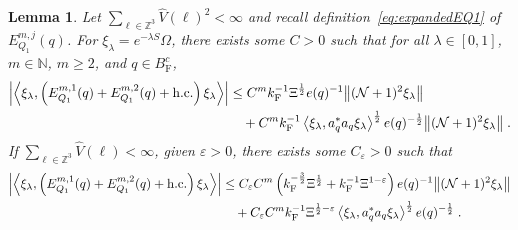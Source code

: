 \documentclass[12pt,a4paper]{article}
\numberwithin{equation}{section}
\newcommand{\NNN}{\mathbb{N}}
\newcommand{\1}{\mathbb{I}}
\newcommand{\F}{\mathrm{F}}
\newcommand{\Zstar}{\mathbb{Z}^3} %
\newcommand{\Z}{\mathbb{Z}}
\newcommand{\NN}{\mathcal{N}}
\newcommand{\half}{\frac{1}{2}}
\newcommand{\eva}[1]{\left\langle #1 \right\rangle}
\theoremstyle{plain}
\newtheorem{lemma}[theorem]{Lemma}
\theoremstyle{definition}
\theoremstyle{remark}
\theoremstyle{plain}
\theoremstyle{definition}
\theoremstyle{remark}
\begin{document}
\begin{lemma} \label{lem:EQ111}
Let $ \sum_{\ell \in \Zstar} \hat{V}(\ell)^2 < \infty $ and recall definition~\eqref{eq:expandedEQ1} of $ E_{Q_1}^{m,j}(q) $. For $\xi_\lambda = e^{-\lambda S} \Omega$, there exists some $ C > 0 $ such that for all $ \lambda \in [0,1] $, $ m \in \NNN $, $ m \ge 2 $, and $ q \in B_{\F}^c $,
\begin{align} \label{eq:estEQ111_Coulomb}
	\abs{\eva{\xi_\lambda,\left(E^{m,1}_{Q_1}(q) + E^{m,2}_{Q_1}(q) + \mathrm{h.c.}\right) \xi_\lambda }} 
	&\leq C^m k_{\F}^{-1} \Xi^{\half} e(q)^{-1}
		\norm{ (\NN+1)^2 \xi_\lambda}  \nonumber\\
	&\quad + C^m k_{\F}^{-1} \eva{\xi_\lambda, a_q^* a_q \xi_\lambda}^{\half} e(q)^{-\half} \norm{(\NN+1)^2 \xi_\lambda} \;.
\end{align}
If $ \sum_{\ell \in \Zstar} \hat{V}(\ell) < \infty $, given $ \varepsilon > 0 $, there exists some $ C_\varepsilon > 0 $ such that
\begin{align} \label{eq:estEQ111}
	\abs{\eva{\xi_\lambda,\left(E^{m,1}_{Q_1}(q) + E^{m,2}_{Q_1}(q) + \mathrm{h.c.}\right) \xi_\lambda }} 
	&\leq C_\varepsilon C^m \left(
		k_{\F}^{-\frac{3}{2}} \Xi^\half
		+ k_{\F}^{-1}\Xi^{1-\varepsilon} \right) e(q)^{-1}
		\norm{ (\NN+1)^2 \xi_\lambda} \nonumber\\
	&\quad + C_\varepsilon C^m k_{\F}^{-1} \Xi^{\half - \varepsilon} \eva{\xi_\lambda, a_q^* a_q \xi_\lambda}^{\half} e(q)^{-\half} \;.
\end{align}
\end{lemma}
\end{document}
